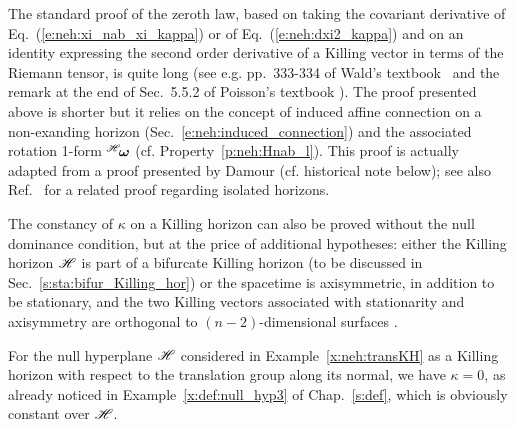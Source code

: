 \begin{remark}
The standard proof of the zeroth law, based on taking the covariant derivative
of Eq.~(\ref{e:neh:xi_nab_xi_kappa}) \cite{BardeCH73,Wald84} or of Eq.~(\ref{e:neh:dxi2_kappa})
\cite{Heusl96} and on an identity expressing the second order derivative of
a Killing vector in terms of the Riemann tensor, is quite long (see
e.g. pp.~333-334 of Wald's textbook~\cite{Wald84} and the remark at the end of Sec.~5.5.2 of Poisson's
textbook \cite{Poiss04}). The proof presented above is shorter but it relies on
the concept of induced affine connection on a non-exanding horizon
(Sec.~\ref{e:neh:induced_connection}) and the associated rotation
1-form ${}^{\mathscr{H}}\!\bm{\omega}$ (cf.
Property~\ref{p:neh:Hnab_l}). This proof is actually adapted from a proof
presented by Damour \cite{Damou79,Damou82} (cf. historical note below); see
also Ref.~\cite{AshteBL01} for a related proof regarding isolated horizons.
\end{remark}

\begin{remark}
\label{r:neh:zero_law_wo_NDEC}
The constancy of $\kappa$ on a Killing horizon can also be proved without the
null dominance condition, but at the price of additional hypotheses:
either the Killing horizon $\mathscr{H}$ is part of a bifurcate Killing horizon
(to be discussed in Sec.~\ref{s:sta:bifur_Killing_hor}) \cite{KayW91,Wald92,Poiss04}
or the spacetime is axisymmetric, in addition to be stationary, and
the two Killing vectors associated
with stationarity and
axisymmetry are orthogonal to $(n-2)$-dimensional
surfaces \cite{Carte73b,RaczW96}.
\end{remark}

\begin{example}
\label{x:neh:transKH_kappa}
For the null hyperplane $\mathscr{H}$ considered in Example~\ref{x:neh:transKH} as a Killing horizon with respect to the translation group along its normal, we have
$\kappa = 0$, as already noticed in Example~\ref{x:def:null_hyp3} of Chap.~\ref{s:def},
which is obviously constant over $\mathscr{H}$.
\end{example}

